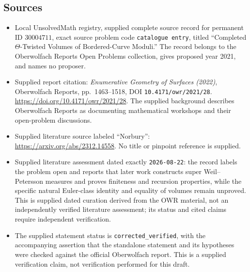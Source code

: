 \documentclass[11pt]{article}
\begin{document}
\subsection{Sources}
\begin{itemize}
\item Local UnsolvedMath registry, supplied complete source record for permanent ID \(30004711\), exact source problem code \texttt{catalogue entry}, titled ``Completed \(\Theta\)-Twisted Volumes of Bordered-Curve Moduli.'' The record belongs to the Oberwolfach Reports Open Problems collection, gives proposed year 2021, and names no proposer.
\item Supplied report citation: \emph{Enumerative Geometry of Surfaces (2022)}, Oberwolfach Reports, pp.\ 1463--1518, DOI \texttt{10.4171/owr/2021/28}. \url{https://doi.org/10.4171/owr/2021/28}. The supplied background describes Oberwolfach Reports as documenting mathematical workshops and their open-problem discussions.
\item Supplied literature source labeled ``Norbury'': \url{https://arxiv.org/abs/2312.14558}. No title or pinpoint reference is supplied.
\item Supplied literature assessment dated exactly \texttt{2026-08-22}: the record labels the problem open and reports that later work constructs super Weil--Petersson measures and proves finiteness and recursion properties, while the specific natural Euler-class identity and equality of volumes remain unproved. This is supplied dated curation derived from the OWR material, not an independently verified literature assessment; its status and cited claims require independent verification.
\item The supplied statement status is \texttt{corrected\_verified}, with the accompanying assertion that the standalone statement and its hypotheses were checked against the official Oberwolfach report. This is a supplied verification claim, not verification performed for this draft.
\end{itemize}
\end{document}
